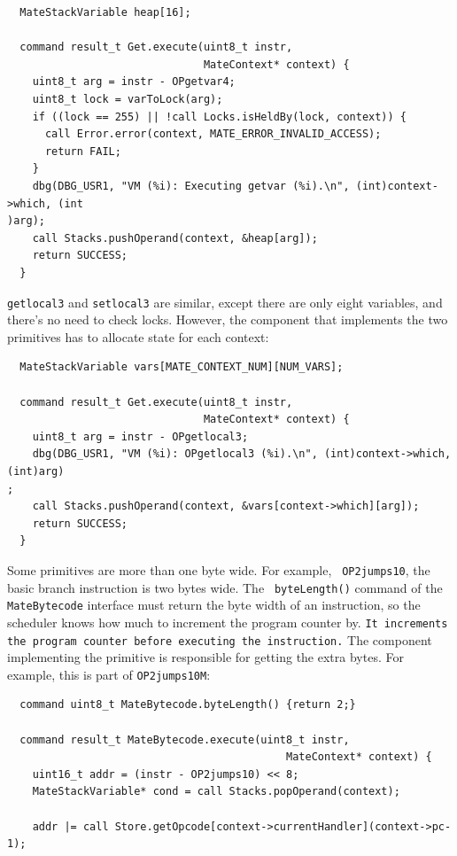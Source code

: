 \documentclass[12pt]{article}
\begin{document}
{\scriptsize
\begin{verbatim}
  MateStackVariable heap[16];

  command result_t Get.execute(uint8_t instr,
                               MateContext* context) {
    uint8_t arg = instr - OPgetvar4;
    uint8_t lock = varToLock(arg);
    if ((lock == 255) || !call Locks.isHeldBy(lock, context)) {
      call Error.error(context, MATE_ERROR_INVALID_ACCESS);
      return FAIL;
    }
    dbg(DBG_USR1, "VM (%i): Executing getvar (%i).\n", (int)context->which, (int
)arg);
    call Stacks.pushOperand(context, &heap[arg]);
    return SUCCESS;
  }
\end{verbatim}
}

{\tt getlocal3} and {\tt setlocal3} are similar, except there
are only eight variables, and there's no need to check locks. However,
the component that implements the two primitives has to allocate state
for each context:

{\scriptsize
\begin{verbatim}
  MateStackVariable vars[MATE_CONTEXT_NUM][NUM_VARS];

  command result_t Get.execute(uint8_t instr,
                               MateContext* context) {
    uint8_t arg = instr - OPgetlocal3;
    dbg(DBG_USR1, "VM (%i): OPgetlocal3 (%i).\n", (int)context->which, (int)arg)
;
    call Stacks.pushOperand(context, &vars[context->which][arg]);
    return SUCCESS;
  }
\end{verbatim}
}

Some primitives are more than one byte wide. For example, {\tt
OP2jumps10}, the basic branch instruction is two bytes wide. The {\tt
byteLength()} command of the {\tt MateBytecode} interface must return
the byte width of an instruction, so the scheduler knows how much to
increment the program counter by. {\tt It increments the program
counter before executing the instruction.} The component implementing
the primitive is responsible for getting the extra bytes. For example,
this is part of {\tt OP2jumps10M}:

{\scriptsize
\begin{verbatim}
  command uint8_t MateBytecode.byteLength() {return 2;}

  command result_t MateBytecode.execute(uint8_t instr,
                                            MateContext* context) {
    uint16_t addr = (instr - OP2jumps10) << 8;
    MateStackVariable* cond = call Stacks.popOperand(context);

    addr |= call Store.getOpcode[context->currentHandler](context->pc-1);
\end{verbatim}
}
\end{document}
